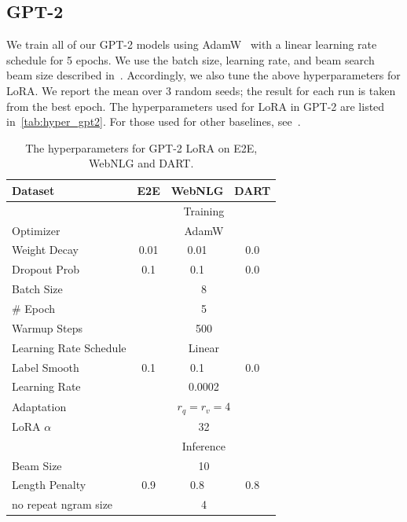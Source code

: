 \documentclass{article} %
\begin{document}
\subsection{GPT-2}
\label{app:hps_gpt2}
We train all of our GPT-2 models using AdamW~\citep{loshchilov2017decoupled} with a linear learning rate schedule for 5 epochs.
We use the batch size, learning rate, and beam search beam size described in~\cite{li_prefix-tuning_2021}.
Accordingly, we also tune the above hyperparameters for LoRA.
We report the mean over 3 random seeds; the result for each run is taken from the best epoch.
The hyperparameters used for LoRA in GPT-2 are listed in~\autoref{tab:hyper_gpt2}.
For those used for other baselines, see~\cite{li_prefix-tuning_2021}.
\begin{table}[h]
\centering
\begin{tabular}{l|ccc}
\hline
\toprule
Dataset & E2E & WebNLG & DART \\
\midrule
&\multicolumn{3}{c}{Training} \\
\midrule
Optimizer & \multicolumn{3}{c}{AdamW} \\
Weight Decay & 0.01 & 0.01 & 0.0\\
Dropout Prob & 0.1 & 0.1 & 0.0\\
Batch Size & \multicolumn{3}{c}{8} \\
\# Epoch & \multicolumn{3}{c}{5} \\
Warmup Steps & \multicolumn{3}{c}{500} \\
Learning Rate Schedule & \multicolumn{3}{c}{Linear} \\
Label Smooth & 0.1 & 0.1 & 0.0 \\
Learning Rate & \multicolumn{3}{c}{0.0002} \\
Adaptation & \multicolumn{3}{c}{$r_q=r_v=4$} \\
LoRA $\alpha$ & \multicolumn{3}{c}{32} \\
\midrule
&\multicolumn{3}{c}{Inference} \\
\midrule
Beam Size & \multicolumn{3}{c}{10} \\
Length Penalty & 0.9 & 0.8 & 0.8 \\
no repeat ngram size & \multicolumn{3}{c}{4} \\
\bottomrule
\end{tabular}
\caption{The hyperparameters for GPT-2 LoRA on E2E, WebNLG and DART.}
\label{tab:hyper_gpt2}
\end{table}
\end{document}
